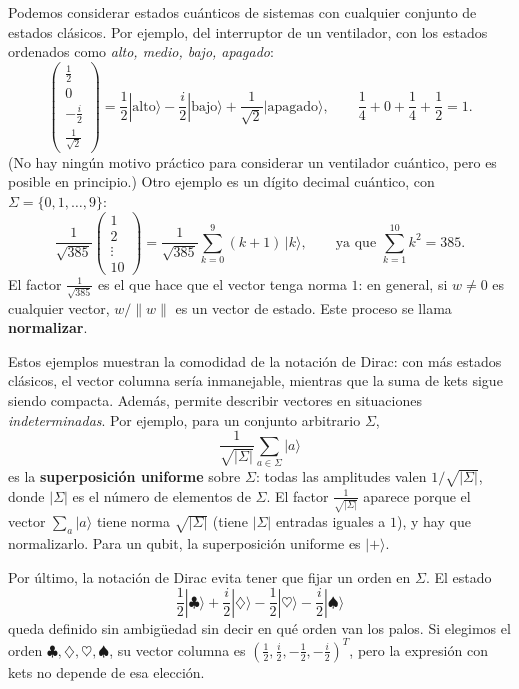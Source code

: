 \documentclass[11pt, a4paper, twoside, openright]{report}
\begin{document}
\noindent Podemos considerar estados cuánticos de sistemas con cualquier conjunto de estados clásicos. Por ejemplo, del interruptor de un ventilador, con los estados ordenados como \textit{alto, medio, bajo, apagado}:
\[
\begin{pmatrix} \frac12 \\ 0 \\ -\frac{i}{2} \\ \frac{1}{\sqrt 2} \end{pmatrix}
= \frac12|\text{alto}\rangle - \frac{i}{2}|\text{bajo}\rangle + \frac{1}{\sqrt 2}|\text{apagado}\rangle,
\qquad \frac14 + 0 + \frac14 + \frac12 = 1.
\]
(No hay ningún motivo práctico para considerar un ventilador cuántico, pero es posible en principio.) Otro ejemplo es un dígito decimal cuántico, con $\Sigma = \{0, 1, \dots, 9\}$:
\[
\frac{1}{\sqrt{385}}\begin{pmatrix} 1 \\ 2 \\ \vdots \\ 10 \end{pmatrix} = \frac{1}{\sqrt{385}}\sum_{k=0}^{9} (k+1)\,|k\rangle,
\qquad \text{ya que } \sum_{k=1}^{10} k^2 = 385.
\]
El factor $\frac{1}{\sqrt{385}}$ es el que hace que el vector tenga norma $1$: en general, si $w \neq 0$ es cualquier vector, $w / \|w\|$ es un vector de estado. Este proceso se llama \textbf{normalizar}.

\noindent Estos ejemplos muestran la comodidad de la notación de Dirac: con más estados clásicos, el vector columna sería inmanejable, mientras que la suma de kets sigue siendo compacta. Además, permite describir vectores en situaciones \textit{indeterminadas}. Por ejemplo, para un conjunto arbitrario $\Sigma$,
\[ \frac{1}{\sqrt{|\Sigma|}}\sum_{a \in \Sigma} |a\rangle \]
es la \textbf{superposición uniforme} sobre $\Sigma$: todas las amplitudes valen $1/\sqrt{|\Sigma|}$, donde $|\Sigma|$ es el número de elementos de $\Sigma$. El factor $\frac{1}{\sqrt{|\Sigma|}}$ aparece porque el vector $\sum_a |a\rangle$ tiene norma $\sqrt{|\Sigma|}$ (tiene $|\Sigma|$ entradas iguales a $1$), y hay que normalizarlo. Para un qubit, la superposición uniforme es $|+\rangle$.

\noindent Por último, la notación de Dirac evita tener que fijar un orden en $\Sigma$. El estado
\[ \frac12|\clubsuit\rangle + \frac{i}{2}|\diamondsuit\rangle - \frac12|\heartsuit\rangle - \frac{i}{2}|\spadesuit\rangle \]
queda definido sin ambigüedad sin decir en qué orden van los palos. Si elegimos el orden $\clubsuit, \diamondsuit, \heartsuit, \spadesuit$, su vector columna es $\left(\frac12, \frac{i}{2}, -\frac12, -\frac{i}{2}\right)^T$, pero la expresión con kets no depende de esa elección.
\end{document}
